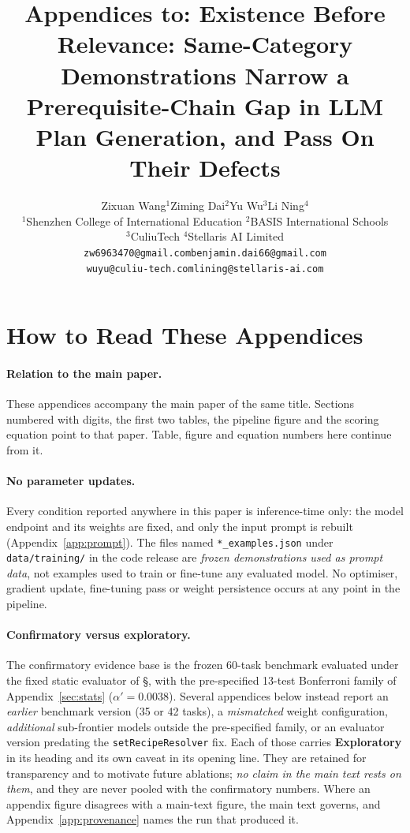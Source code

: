 \documentclass[letterpaper]{article} %
\title{Appendices to: Existence Before Relevance: Same-Category Demonstrations
       Narrow a Prerequisite-Chain Gap in LLM Plan Generation, and Pass On Their
       Defects}
\author{%
  Zixuan Wang$^{1}$\quad Ziming Dai$^{2}$\quad Yu Wu$^{3}$\quad Li Ning$^{4}$ \\
  $^{1}$Shenzhen College of International Education\quad
  $^{2}$BASIS International Schools \\
  $^{3}$CuliuTech\quad
  $^{4}$Stellaris AI Limited \\
  \texttt{\small zw6963470@gmail.com}\quad \texttt{\small benjamin.dai66@gmail.com} \\
  \texttt{\small wuyu@culiu-tech.com}\quad \texttt{\small lining@stellaris-ai.com}
}
\newcommand{\appref}[1]{Appendix~\ref{#1}}
\newcommand{\bodyref}[1]{\getrefnumber{#1}}
\begin{document}
\maketitle

\appendix
\setcounter{table}{2}
\setcounter{figure}{1}
\setcounter{equation}{1}

\section*{How to Read These Appendices}

\paragraph{Relation to the main paper.}  These appendices accompany the main
paper of the same title.  Sections numbered with digits, the first two tables, the
pipeline figure and the scoring equation point to that paper.  Table, figure and
equation numbers here continue from it.

\paragraph{No parameter updates.}  Every condition reported anywhere in
this paper is inference-time only: the model endpoint and its weights
are fixed, and only the input prompt is rebuilt
(\appref{app:prompt}).  The files named \texttt{*\_examples.json} under
\texttt{data/training/} in the code release are \emph{frozen
demonstrations used as prompt data}, not examples used to train or
fine-tune any evaluated model.  No optimiser, gradient update,
fine-tuning pass or weight persistence occurs at any point in the
pipeline.

\paragraph{Confirmatory versus exploratory.}  The confirmatory evidence
base is the frozen 60-task benchmark evaluated under the fixed static
evaluator of \S\bodyref{sec:protocol}, with the pre-specified 13-test
Bonferroni family of \appref{sec:stats} ($\alpha'{=}0.0038$).  Several
appendices below instead report an \emph{earlier} benchmark version (35
or 42 tasks), a \emph{mismatched} weight configuration, \emph{additional}
sub-frontier models outside the pre-specified family, or an evaluator version predating the
\texttt{setRecipeResolver} fix.  Each of those carries
\textbf{Exploratory} in its heading and its own caveat in its opening
line.  They are retained for transparency and to motivate future
ablations; \emph{no claim in the main text rests on them}, and they are
never pooled with the confirmatory numbers.  Where an appendix figure
disagrees with a main-text figure, the main text governs, and
\appref{app:provenance} names the run that produced it.
\end{document}
